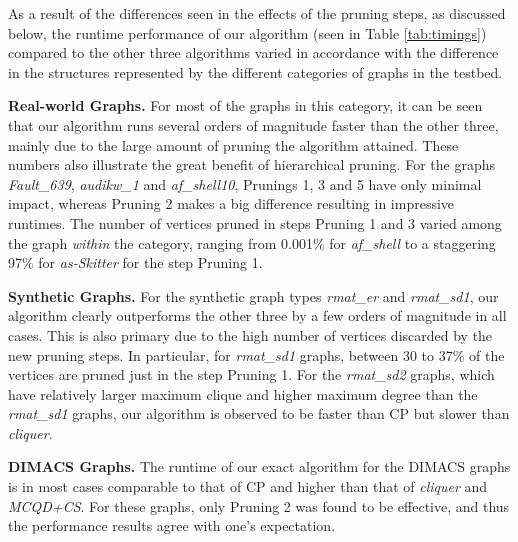 As a result  of the differences seen in the effects of the pruning steps, as discussed below,
the runtime performance of our algorithm (seen in Table \ref{tab:timings}) compared
to the other three algorithms varied in accordance with the difference in the structures represented 
by the different categories of graphs in the testbed.

{\bf Real-world Graphs. }
For most of the graphs in this category, it can be seen that our algorithm runs several orders of magnitude faster than the other three, mainly due to the large amount of pruning the algorithm attained. These numbers also illustrate the great benefit of hierarchical pruning. 
For the graphs {\em Fault\_639}, {\em audikw\_1} and {\em af\_shell10}, 
Prunings 1, 3 and 5 have only minimal impact,
whereas Pruning 2 makes a big difference resulting in impressive runtimes. 
The number of vertices pruned in steps Pruning 1 and 3 varied among the 
graph {\em within} the
category, ranging from 0.001\% for {\it af\_shell} to a staggering 97\% for {\it as-Skitter} 
for the step Pruning 1. 



{\bf Synthetic Graphs. }
For the synthetic graph types {\it rmat\_er} and {\it rmat\_sd1}, our algorithm clearly outperforms 
the other three by a few orders of magnitude in all cases. 
This is also primary due to the high number of vertices discarded by the new pruning steps. 
In particular, for {\it rmat\_sd1} graphs, between 30 to 37\% of the vertices are pruned just in the step Pruning 1. 
For the {\it rmat\_sd2} graphs, which have relatively larger maximum clique and higher maximum degree than the {\it rmat\_sd1} graphs, our algorithm is observed to be faster than 
CP but slower than {\em cliquer}. 

{\bf DIMACS Graphs. }
The runtime of our exact algorithm for the DIMACS graphs is 
in most cases comparable to that of CP and higher than that of {\it cliquer}
and {\it MCQD+CS}.
For these graphs, only Pruning 2 was found to be effective, 
and thus the performance results agree with one's expectation. 



